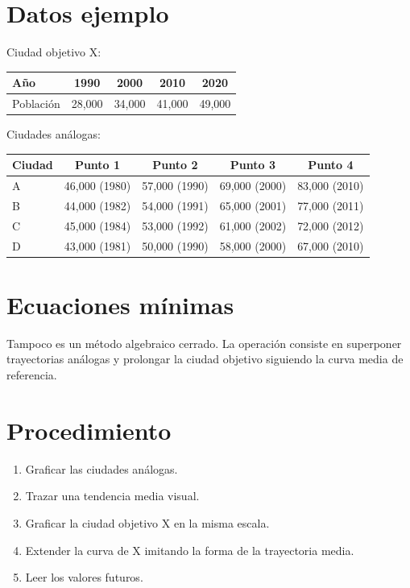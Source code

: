 \documentclass[12pt]{article}
\begin{document}

\section{Datos ejemplo}
Ciudad objetivo X:
\begin{center}
\begin{tabular}{lcccc}
\toprule
Año & 1990 & 2000 & 2010 & 2020 \\
\midrule
Población & 28,000 & 34,000 & 41,000 & 49,000 \\
\bottomrule
\end{tabular}
\end{center}

Ciudades análogas:
\begin{center}
\begin{tabular}{lcccc}
\toprule
Ciudad & Punto 1 & Punto 2 & Punto 3 & Punto 4 \\
\midrule
A & 46,000 (1980) & 57,000 (1990) & 69,000 (2000) & 83,000 (2010) \\
B & 44,000 (1982) & 54,000 (1991) & 65,000 (2001) & 77,000 (2011) \\
C & 45,000 (1984) & 53,000 (1992) & 61,000 (2002) & 72,000 (2012) \\
D & 43,000 (1981) & 50,000 (1990) & 58,000 (2000) & 67,000 (2010) \\
\bottomrule
\end{tabular}
\end{center}

\section{Ecuaciones mínimas}
Tampoco es un método algebraico cerrado. La operación consiste en superponer trayectorias análogas y prolongar la ciudad objetivo siguiendo la curva media de referencia.

\section{Procedimiento}
\begin{enumerate}
\item Graficar las ciudades análogas.
\item Trazar una tendencia media visual.
\item Graficar la ciudad objetivo X en la misma escala.
\item Extender la curva de X imitando la forma de la trayectoria media.
\item Leer los valores futuros.
\end{enumerate}
\end{document}
